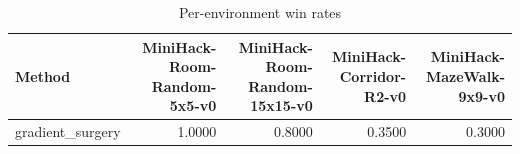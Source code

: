 \begin{table}[htbp]
\centering
\caption{Per-environment win rates}
\label{tab:per-env}
\begin{tabular}{lrrrr}
\toprule
\textbf{Method} & \textbf{MiniHack-Room-Random-5x5-v0} & \textbf{MiniHack-Room-Random-15x15-v0} & \textbf{MiniHack-Corridor-R2-v0} & \textbf{MiniHack-MazeWalk-9x9-v0} \\
\midrule
gradient\_surgery & 1.0000 & 0.8000 & 0.3500 & 0.3000 \\
\bottomrule
\end{tabular}
\end{table}